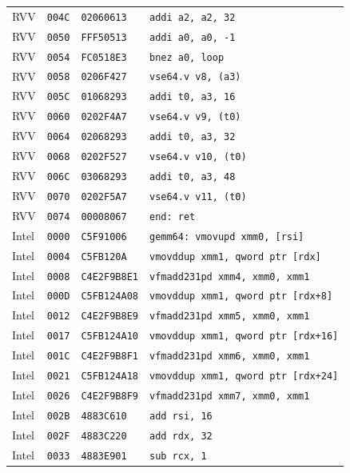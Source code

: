 \begin{table}[htbp]
\begin{tabular}{@{}l|l|l|p{7.2cm}@{}}
RVV & \texttt{004C} & \texttt{02060613} & \texttt{addi a2, a2, 32} \\
RVV & \texttt{0050} & \texttt{FFF50513} & \texttt{addi a0, a0, -1} \\
RVV & \texttt{0054} & \texttt{FC0518E3} & \texttt{bnez a0, loop} \\
RVV & \texttt{0058} & \texttt{0206F427} & \texttt{vse64.v v8, (a3)} \\
RVV & \texttt{005C} & \texttt{01068293} & \texttt{addi t0, a3, 16} \\
RVV & \texttt{0060} & \texttt{0202F4A7} & \texttt{vse64.v v9, (t0)} \\
RVV & \texttt{0064} & \texttt{02068293} & \texttt{addi t0, a3, 32} \\
RVV & \texttt{0068} & \texttt{0202F527} & \texttt{vse64.v v10, (t0)} \\
RVV & \texttt{006C} & \texttt{03068293} & \texttt{addi t0, a3, 48} \\
RVV & \texttt{0070} & \texttt{0202F5A7} & \texttt{vse64.v v11, (t0)} \\
RVV & \texttt{0074} & \texttt{00008067} & \texttt{end: ret} \\
\midrule
Intel & \texttt{0000} & \texttt{C5F91006} & \texttt{gemm64: vmovupd xmm0, [rsi]} \\
Intel & \texttt{0004} & \texttt{C5FB120A} & \texttt{vmovddup xmm1, qword ptr [rdx]} \\
Intel & \texttt{0008} & \texttt{C4E2F9B8E1} & \texttt{vfmadd231pd xmm4, xmm0, xmm1} \\
Intel & \texttt{000D} & \texttt{C5FB124A08} & \texttt{vmovddup xmm1, qword ptr [rdx+8]} \\
Intel & \texttt{0012} & \texttt{C4E2F9B8E9} & \texttt{vfmadd231pd xmm5, xmm0, xmm1} \\
Intel & \texttt{0017} & \texttt{C5FB124A10} & \texttt{vmovddup xmm1, qword ptr [rdx+16]} \\
Intel & \texttt{001C} & \texttt{C4E2F9B8F1} & \texttt{vfmadd231pd xmm6, xmm0, xmm1} \\
Intel & \texttt{0021} & \texttt{C5FB124A18} & \texttt{vmovddup xmm1, qword ptr [rdx+24]} \\
Intel & \texttt{0026} & \texttt{C4E2F9B8F9} & \texttt{vfmadd231pd xmm7, xmm0, xmm1} \\
Intel & \texttt{002B} & \texttt{4883C610} & \texttt{add rsi, 16} \\
Intel & \texttt{002F} & \texttt{4883C220} & \texttt{add rdx, 32} \\
Intel & \texttt{0033} & \texttt{4883E901} & \texttt{sub rcx, 1} \\

\end{tabular}
\end{table}
